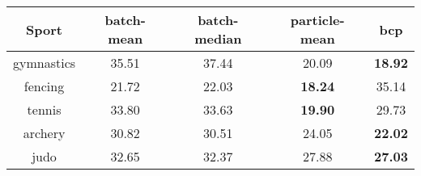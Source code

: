 \begin{tabular}{|c|c|c|c|c|}
\hline
Sport & batch-mean & batch-median & particle-mean & bcp \\
\hline
gymnastics & 35.51 & 37.44 & 20.09 & \textbf{18.92} \\
fencing & 21.72 & 22.03 & \textbf{18.24} & 35.14 \\
tennis & 33.80 & 33.63 & \textbf{19.90} & 29.73 \\
archery & 30.82 & 30.51 & 24.05 & \textbf{22.02} \\
judo & 32.65 & 32.37 & 27.88 & \textbf{27.03} \\
\hline
\end{tabular}
